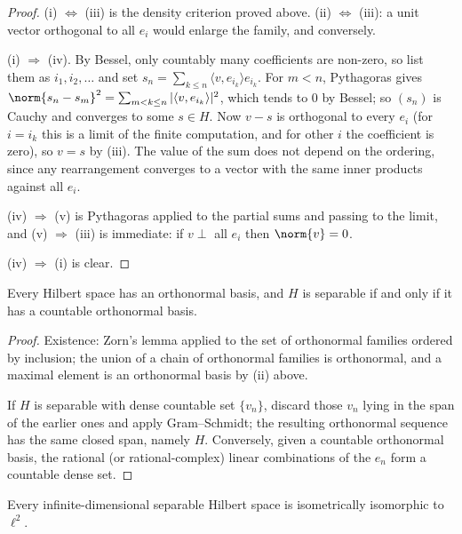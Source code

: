 \documentclass[a4paper]{scrartcl}
\newcommand{\ip}[2]{\langle #1, #2 \rangle}
\begin{document}
\begin{proof}
	(i) $\iff$ (iii) is the density criterion proved above. (ii) $\iff$ (iii): a unit vector orthogonal to all $e_i$ would enlarge the family, and conversely.

	(i) $\Rightarrow$ (iv). By Bessel, only countably many coefficients are non-zero, so list them as $i_1, i_2, \dots$ and set $s_n = \sum_{k \leq n}\ip{v}{e_{i_k}}e_{i_k}$. For $m<n$, Pythagoras gives $\norm{s_n - s_m}^2 = \sum_{m<k\leq n}|\ip{v}{e_{i_k}}|^2$, which tends to $0$ by Bessel; so $(s_n)$ is Cauchy and converges to some $s \in H$. Now $v - s$ is orthogonal to every $e_i$ (for $i = i_k$ this is a limit of the finite computation, and for other $i$ the coefficient is zero), so $v = s$ by (iii). The value of the sum does not depend on the ordering, since any rearrangement converges to a vector with the same inner products against all $e_i$.

	(iv) $\Rightarrow$ (v) is Pythagoras applied to the partial sums and passing to the limit, and (v) $\Rightarrow$ (iii) is immediate: if $v \perp$ all $e_i$ then $\norm{v}=0$.

	(iv) $\Rightarrow$ (i) is clear.
\end{proof}

\begin{proposition}
	Every Hilbert space has an orthonormal basis, and $H$ is separable if and only if it has a countable orthonormal basis.
\end{proposition}

\begin{proof}
	Existence: Zorn's lemma applied to the set of orthonormal families ordered by inclusion; the union of a chain of orthonormal families is orthonormal, and a maximal element is an orthonormal basis by (ii) above.

	If $H$ is separable with dense countable set $\{v_n\}$, discard those $v_n$ lying in the span of the earlier ones and apply Gram--Schmidt; the resulting orthonormal sequence has the same closed span, namely $H$. Conversely, given a countable orthonormal basis, the rational (or rational-complex) linear combinations of the $e_n$ form a countable dense set.
\end{proof}

\begin{theorem}
	Every infinite-dimensional separable Hilbert space is isometrically isomorphic to $\ell^2$.
\end{theorem}
\end{document}
